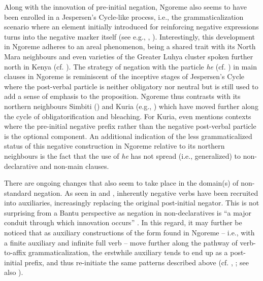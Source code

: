 \documentclass[output=paper,colorlinks,citecolor=brown,draftmode]{langscibook}
\begin{document}
Along with the innovation of pre-initial negation, Ngoreme also seems to have been enrolled in a Jespersen’s Cycle-like process, i.e., the grammaticalization scenario where an element initially introduced for reinforcing negative expressions turns into the negative marker itself (see e.g., \citealt{Auwera2010}, \citealt{DevosAuwera2013}). Interestingly, this development in Ngoreme adheres to an areal phenomenon, being a shared trait with its North Mara neighbours and even varieties of the Greater Luhya cluster spoken further north in Kenya (cf. \citealt{DevosAuwera2013}). The strategy of negation with the particle \textit{he} (cf. ) in main clauses in Ngoreme is reminiscent of the inceptive stages of Jespersen’s Cycle where the post-verbal particle is neither obligatory nor neutral but is still used to add a sense of emphasis to the proposition. Ngoreme thus contrasts with its northern neighbours Simbiti (\citealt{WalkerOverton2018}) and Kuria (e.g., \citealt{Rose2001}) which have moved further along the cycle of obligatorification and bleaching. For Kuria, \citet{Rose2001} even mentions contexts where the pre-initial negative prefix rather than the negative post-verbal particle is the optional component. An additional indication of the less grammaticalized status of this negative construction in Ngoreme relative to its northern neighbours is the fact that the use of \textit{he} has not spread (i.e., generalized) to non-declarative and non-main clauses. 

There are ongoing changes that also seem to take place in the domain(s) of non-standard negation. As seen in  and , inherently negative verbs have been recruited into auxiliaries, increasingly replacing the original post-initial negator. This is not surprising from a Bantu perspective as negation in non-declaratives is “a major conduit through which innovation occurs” \citep[191]{Nurse2008}. In this regard, it may further be noticed that as auxiliary constructions of the form found in Ngoreme – i.e., with a finite auxiliary and infinite full verb – move further along the pathway of verb-to-affix grammaticalization, the erstwhile auxiliary tends to end up as a post-initial prefix, and thus re-initiate the same patterns described above (cf. \citealt[261--284]{Güldemann1996}, \citeyear{Güldemann1999}; see also \citealt[194--196]{Nurse2008}). 
\end{document}
